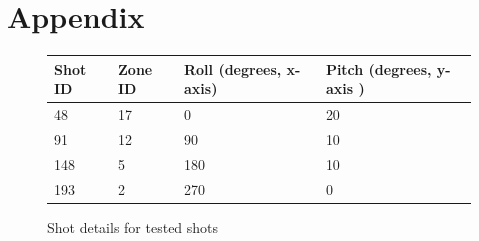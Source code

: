 \documentclass[11pt]{article}
\begin{document}
\section{Appendix}
\begin{figure}[H]
\begin{center}
\begin{tabular}{ | m{2cm} | m{2cm}| m{3cm} |m{3cm} | } 
 \hline
   \textbf{Shot ID} & \textbf{Zone ID} & \textbf{Roll (degrees, x-axis)} & \textbf{Pitch (degrees, y-axis )} \\ \hline
   48 & 17 & 0 & 20  \\ \hline 
   91 & 12 & 90 & 10  \\ \hline 
   148 & 5 & 180 & 10 \\ \hline 
   193 & 2 & 270 & 0 \\ \hline 
\end{tabular}
   \caption{Shot details for tested shots}
\end{center}
\end{figure}
\end{document}
